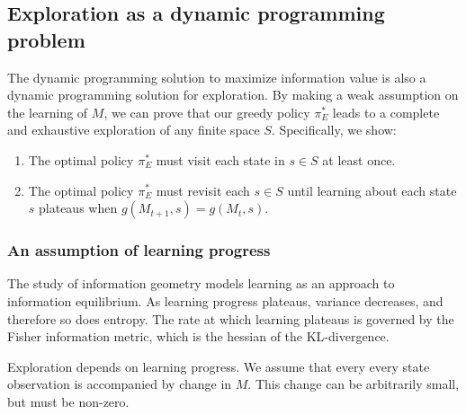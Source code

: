 \documentclass[9pt,twocolumn,twoside]{pnas-new}
\begin{document}
\subsection*{Exploration as a dynamic programming problem}
The dynamic programming solution to maximize information value is also a dynamic programming solution for exploration. By making a weak assumption on the learning of $M$, we can prove that our greedy policy $\pi^*_E$ leads to a complete and exhaustive exploration of any finite space $S$. Specifically, we show:

\begin{enumerate}[noitemsep,wide=0pt,leftmargin=\dimexpr\labelwidth+2\labelsep\relax]
    \item The optimal policy $\pi^*_E$ must visit each state in $s \in S$ at least once.
    \item The optimal policy $\pi^*_E$ must revisit each $s \in S$ until learning about each state $s$ plateaus when $g(M_{t+1}, s) = g(M_{t},s)$.
\end{enumerate}


\subsubsection*{An assumption of learning progress}
The study of information geometry models learning as an approach to information equilibrium. As learning progress plateaus, variance decreases, and therefore so does entropy. The rate at which learning plateaus is governed by the Fisher information metric, which is the hessian of the KL-divergence.


Exploration depends on learning progress. We assume that every every state observation is accompanied by change in $M$. This change can be arbitrarily small, but must be non-zero. 
\end{document}
